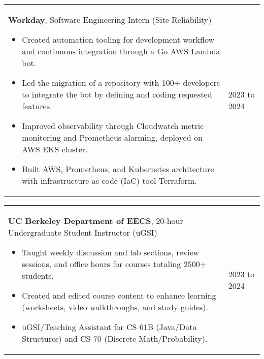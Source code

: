 \documentclass[10pt, a4paper]{article}
\newenvironment{highlights}{
        \begin{itemize}[
                topsep=0pt,
                parsep=0.10 cm,
                partopsep=0pt,
                itemsep=0pt,
                after=\vspace{-1\baselineskip},
                leftmargin=0.4 cm + 3pt
            ]
    }{
        \end{itemize}
    } %
\begin{document}
        \begin{tabularx}{ cm-0.13cm}{K{0.2 cm} R{4.1 cm}}
            \textbf{Workday}, Software Engineering Intern (Site Reliability)
            \vspace{0.10 cm}
            \begin{highlights}
                \item Created automation tooling for development workflow and continuous integration through a Go AWS Lambda bot. 
                \item Led the migration of a repository with 100+ developers to integrate the bot by defining and coding requested features. 
                \item Improved observability through Cloudwatch metric monitoring and Prometheus alarming, deployed on AWS EKS cluster. 
                \item Built AWS, Prometheus, and Kubernetes architecture with infrastructure as code (IaC) tool Terraform. \hspace*{-0.2cm}
            \end{highlights}
        &
            2023 to 2024
        \end{tabularx}

        \vspace{0.12 cm}
        \begin{tabularx}{ cm-0.13cm}{K{0.2 cm} R{4.1 cm}}
            \textbf{UC Berkeley Department of EECS}, 20-hour Undergraduate Student Instructor (uGSI)
            \vspace{0.10 cm}
            \begin{highlights}
                \item Taught weekly discussion and lab sections, review sessions, and office hours for courses totaling 2500+ students. 
                \item Created and edited course content to enhance learning (worksheets, video walkthroughs, and study guides). 
                \item uGSI/Teaching Assistant for CS 61B (Java/Data Structures) and CS 70 (Discrete Math/Probability). \hspace*{-0.2cm}
            \end{highlights}
        &
            2023 to 2024
        \end{tabularx}
\end{document}
